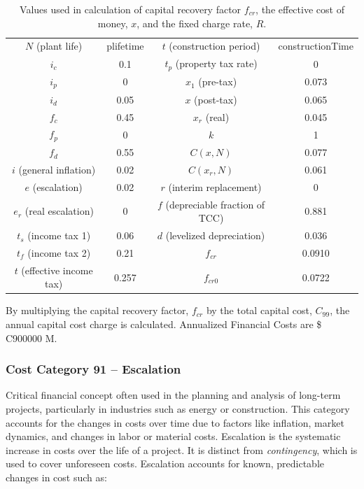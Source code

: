 \begin{table}
    \centering
    \begin{tabular}{cc|cc}
        \hline
        $N$ (plant life)  & plifetime & $t$ (construction period) & constructionTime\\
        $i_c$  & 0.1 & $t_p$ (property tax rate)& 0\\
        $i_p$ & 0 & $x_1$ (pre-tax)& 0.073\\
        $i_d$ & 0.05 & $x$ (post-tax)& 0.065\\
        $f_c$ & 0.45 & $x_r$ (real)& 0.045\\
        $f_p$ & 0 & $k$ & 1\\
        $f_d$ & 0.55 & $C(x,N)$ & 0.077\\
        $i$ (general inflation) & 0.02 & $C(x_r,N)$ & 0.061\\
        $e$  (escalation)& 0.02 & $r$ (interim replacement)& 0\\
        $e_r$ (real escalation) & 0 & $f$ (depreciable fraction of TCC)& 0.881\\
        $t_s$ (income tax 1) & 0.06 & $d$ (levelized depreciation)& 0.036\\
        $t_f$ (income tax 2) & 0.21 & $f_{cr}$ & 0.0910\\
        $t$ (effective income tax) & 0.257 & $f_{cr0}$ & 0.0722\\
        \hline
    \end{tabular}
    \caption{Values used in calculation of capital recovery factor  $f_{cr}$, the effective cost of money, $x$, and the fixed charge rate, $R$.}
    \label{tab:ec_vals}
    \label{tab:my_label}
\end{table}

By multiplying the capital recovery factor, $f_{cr}$ by the total capital cost, $C_{99}$, the annual capital cost charge is calculated.
Annualized Financial Costs are \$ C900000 M.

\subsubsection*{Cost Category 91 – Escalation}
Critical financial concept often used in the planning and analysis of long-term projects, particularly in industries such as energy or construction. This category accounts for the changes in costs over time due to factors like inflation, market dynamics, and changes in labor or material costs. Escalation is the systematic increase in costs over the life of a project. It is distinct from \textit{contingency}, which is used to cover unforeseen costs. Escalation accounts for known, predictable changes in cost such as:

